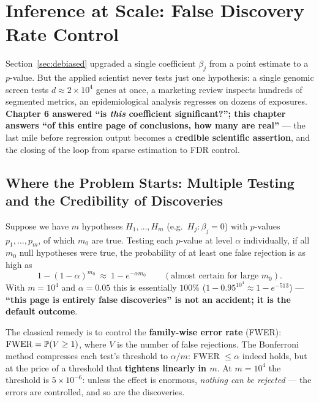 \section{Inference at Scale: False Discovery Rate Control}\label{sec:fdr}

Section~\ref{sec:debiased} upgraded a single coefficient $\beta_j$ from a point estimate to a $p$-value. But the applied scientist never tests just one hypothesis: a single genomic screen tests $d \approx 2\times 10^4$ genes at once, a marketing review inspects hundreds of segmented metrics, an epidemiological analysis regresses on dozens of exposures. \textbf{Chapter 6 answered ``is \emph{this} coefficient significant?''; this chapter answers ``of this entire page of conclusions, how many are real''} — the last mile before regression output becomes a \textbf{credible scientific assertion}, and the closing of the loop from sparse estimation to FDR control.

\subsection{Where the Problem Starts: Multiple Testing and the Credibility of Discoveries}\label{sec:fdr-problem}

Suppose we have $m$ hypotheses $H_1, \dots, H_m$ (e.g.\ $H_j: \beta_j = 0$) with $p$-values $p_1, \dots, p_m$, of which $m_0$ are true. Testing each $p$-value at level $\alpha$ individually, if all $m_0$ null hypotheses were true, the probability of at least one false rejection is as high as
\[
  1 - (1 - \alpha)^{m_0} \ \approx\ 1 - e^{-\alpha m_0}
  \qquad (\text{almost certain for large } m_0).
\]
With $m = 10^4$ and $\alpha = 0.05$ this is essentially $100\%$ ($1 - 0.95^{10^4} \approx 1 - e^{-513}$) — \textbf{``this page is entirely false discoveries'' is not an accident; it is the default outcome}.

The classical remedy is to control the \textbf{family-wise error rate} (FWER): $\mathrm{FWER} = \mathbb{P}( V \ge 1 )$, where $V$ is the number of false rejections. The Bonferroni method compresses each test's threshold to $\alpha/m$: FWER $\le \alpha$ indeed holds, but at the price of a threshold that \textbf{tightens linearly in $m$}. At $m = 10^4$ the threshold is $5\times 10^{-6}$: unless the effect is enormous, \emph{nothing can be rejected} — the errors are controlled, and so are the discoveries.

